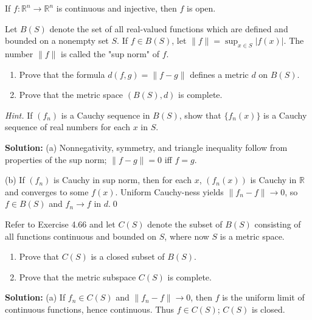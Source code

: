 \begin{theorem}
If $f: \mathbb{R}^n \to \mathbb{R}^n$ is continuous and injective, then $f$ is open.
\end{theorem}



\begin{problembox}
Let $B(S)$ denote the set of all real-valued functions which are defined and bounded on a nonempty set $S$. If $f \in B(S)$, let $\|f\| = \sup_{x \in S} |f(x)|$. The number $\|f\|$ is called the "sup norm" of $f$.
\begin{enumerate}[label=(\alph*)]
\item Prove that the formula $d(f, g) = \|f - g\|$ defines a metric $d$ on $B(S)$.
\item Prove that the metric space $(B(S), d)$ is complete. 
\end{enumerate}
\textit{Hint.} If $(f_n)$ is a Cauchy sequence in $B(S)$, show that $\{f_n(x)\}$ is a Cauchy sequence of real numbers for each $x$ in $S$.
\end{problembox}

\noindent\textbf{Solution:}
(a) Nonnegativity, symmetry, and triangle inequality follow from properties of the sup norm; $\|f-g\|=0$ iff $f=g$.

(b) If $(f_n)$ is Cauchy in sup norm, then for each $x$, $(f_n(x))$ is Cauchy in $\mathbb{R}$ and converges to some $f(x)$. Uniform Cauchy-ness yields $\|f_n-f\|\to 0$, so $f\in B(S)$ and $f_n\to f$ in $d$.\qed



\begin{problembox}
Refer to Exercise 4.66 and let $C(S)$ denote the subset of $B(S)$ consisting of all functions continuous and bounded on $S$, where now $S$ is a metric space.
\begin{enumerate}[label=(\alph*)]
\item Prove that $C(S)$ is a closed subset of $B(S)$.
\item Prove that the metric subspace $C(S)$ is complete.
\end{enumerate}
\end{problembox}

\noindent\textbf{Solution:}
(a) If $f_n\in C(S)$ and $\|f_n-f\|\to 0$, then $f$ is the uniform limit of continuous functions, hence continuous. Thus $f\in C(S)$; $C(S)$ is closed.

